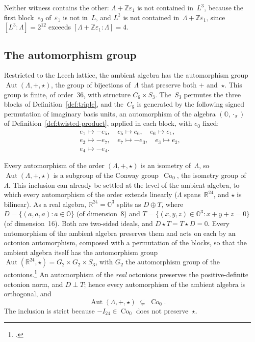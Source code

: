 \documentclass[twoside,english]{paper}
\numberwithin{equation}{section}
\numberwithin{figure}{section}
\theoremstyle{definition}
\theoremstyle{remark}
\newcommand{\OO}{\mathbb{O}}          %
\newcommand{\RR}{\mathbb{R}}
\newcommand{\ZZ}{\mathbb{Z}}
\newcommand{\LL}{\Lambda}             %
\DeclareMathOperator{\Co}{Co}
\DeclareMathOperator{\Aut}{Aut}
\begin{document}
Neither witness contains the other: $\LL + \ZZ\varepsilon_1$ is not
contained in~$L^3$, because the first block~$e_0$ of~$\varepsilon_1$ is
not in~$L$, and $L^3$ is not contained in~$\LL + \ZZ\varepsilon_1$,
since $[L^3 : \LL] = 2^{12}$ exceeds $[\LL + \ZZ\varepsilon_1 : \LL] =
4$.

\subsection{The automorphism group}\label{sec:autgroup}

Restricted to the Leech lattice, the ambient algebra has the
automorphism group $\Aut(\LL, +, \star)$, the group of bijections
of~$\LL$ that preserve both $+$ and~$\star$.  This group is finite, of
order~$36$, with structure $C_6 \times S_3$.  The~$S_3$ permutes the three blocks of
Definition~\ref{def:triple}, and the~$C_6$ is generated by the
following signed permutation of imaginary basis units, an automorphism of
the algebra $(\OO, \cdot_\sigma)$ of
Definition~\ref{def:twisted-product}, applied in each block, with
$e_0$ fixed:
\begin{align}
  &e_1 \mapsto -e_5, \quad e_5 \mapsto e_6, \quad e_6 \mapsto e_1,
    \label{eq:c6-gen-1} \\
  &e_2 \mapsto -e_7, \quad e_7 \mapsto -e_3, \quad e_3 \mapsto e_2,
    \label{eq:c6-gen-2} \\
  &e_4 \mapsto -e_4. \label{eq:c6-gen-3}
\end{align}

Every automorphism of the order $(\LL, +, \star)$ is an isometry
of~$\LL$, so $\Aut(\LL, +, \star)$ is a subgroup of the Conway
group~$\Co_0$, the isometry group of~$\LL$.  This inclusion can already
be settled at the level of the ambient algebra, to which every
automorphism of the order extends linearly ($\LL$ spans~$\RR^{24}$, and
$\star$ is bilinear).  As a real algebra, $\RR^{24} = \OO^3$
splits as $D \oplus T$, where $D = \{(a,a,a) : a \in \OO\}$ (of
dimension~8) and $T = \{(x,y,z) \in \OO^3 : x+y+z = 0\}$ (of
dimension~16).  Both are two-sided ideals, and $D \star T = T \star D
= 0$.  Every automorphism of the ambient algebra preserves them and
acts on each by an octonion automorphism, composed with a permutation
of the blocks, so that the ambient algebra itself has the automorphism
group $\Aut(\RR^{24}, \star) = G_2 \times G_2 \times
S_3$, with $G_2$ the automorphism group of the
octonions.\footnote{\cite{Petersson2026}.}  An automorphism of
the \emph{real} octonions preserves the positive-definite octonion norm,
and $D \perp T$; hence every automorphism of the ambient algebra is
orthogonal, and
\begin{equation}\label{eq:disp9}
  \Aut(\LL, +, \star) \;\subsetneq\; \Co_0 .
\end{equation}
The inclusion is strict because $-I_{24} \in \Co_0$ does not
preserve~$\star$.
\end{document}
